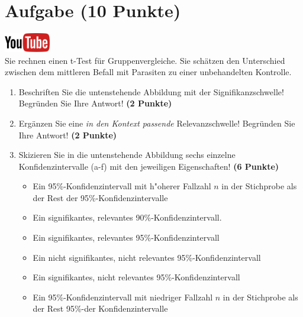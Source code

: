 \documentclass[a4paper, 10pt]{scrartcl}\usepackage[]{graphicx}\usepackage[]{xcolor}
\begin{document}
 
\clearpage

\section{Aufgabe \hfill (10 Punkte)}

\hfill\href{https://youtu.be/CN_O4fYPbhs}{\includegraphics[width =
  2cm]{img/youtube}}\\[1Ex]



Sie rechnen einen t-Test f{\"u}r Gruppenvergleiche. Sie sch{\"a}tzen den Unterschied
zwischen dem mittleren Befall mit Parasiten zu einer unbehandelten Kontrolle. 

\begin{enumerate}
\item Beschriften Sie die untenstehende Abbildung mit der
  Signifikanzschwelle! Begr{\"u}nden Sie Ihre Antwort! \textbf{(2 Punkte)}
\item Erg{\"a}nzen Sie eine \textit{in den Kontext passende} Relevanzschwelle!
  Begr{\"u}nden Sie Ihre Antwort! \textbf{(2 Punkte)} 
\item Skizieren Sie in die
  untenstehende Abbildung sechs einzelne Konfidenzintervalle (a-f) mit den
  jeweiligen Eigenschaften! \textbf{(6 Punkte)}
  \begin{itemize}
  \item[(a)] Ein 95\%-Konfidenzintervall mit h{"o}herer Fallzahl $n$ in der Stichprobe als der Rest der 95\%-Konfidenzintervalle 	
  \item[(b)] Ein signifikantes, relevantes 90\%-Konfidenzintervall. 	
  \item[(c)] Ein signifikantes, relevantes 95\%-Konfidenzintervall 	
  \item[(d)] Ein nicht signifikantes, nicht relevantes 95\%-Konfidenzintervall 
  \item[(e)] Ein signifikantes, nicht relevantes 95\%-Konfidenzintervall
  \item[(f)] Ein 95\%-Konfidenzintervall mit niedriger Fallzahl $n$ in der Stichprobe als der Rest 95\%-der Konfidenzintervalle
  \end{itemize}
\end{enumerate}
\end{document}
